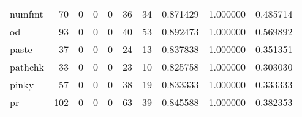 \begin{tabular}{lrrrrrrrrr}
numfmt    &                                        70 &                                                  0 &                                                  0 &                                                  0 &                                                 36 &                                                 34 &                                           0.871429 &                               1.000000 &                             0.485714 \\
od        &                                        93 &                                                  0 &                                                  0 &                                                  0 &                                                 40 &                                                 53 &                                           0.892473 &                               1.000000 &                             0.569892 \\
paste     &                                        37 &                                                  0 &                                                  0 &                                                  0 &                                                 24 &                                                 13 &                                           0.837838 &                               1.000000 &                             0.351351 \\
pathchk   &                                        33 &                                                  0 &                                                  0 &                                                  0 &                                                 23 &                                                 10 &                                           0.825758 &                               1.000000 &                             0.303030 \\
pinky     &                                        57 &                                                  0 &                                                  0 &                                                  0 &                                                 38 &                                                 19 &                                           0.833333 &                               1.000000 &                             0.333333 \\
pr        &                                       102 &                                                  0 &                                                  0 &                                                  0 &                                                 63 &                                                 39 &                                           0.845588 &                               1.000000 &                             0.382353 \\

\end{tabular}

